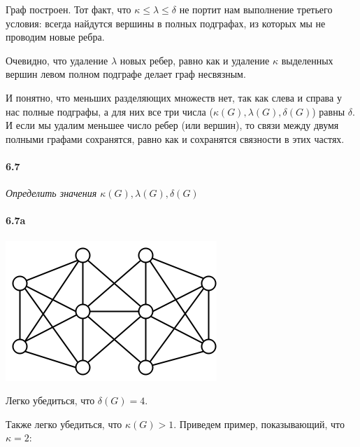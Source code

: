 \documentclass[russian]{article}
\begin{document}
Граф построен. Тот факт, что $\kappa \leqslant \lambda \leqslant \delta$ не портит нам выполнение третьего условия: всегда найдутся вершины в полных подграфах, из которых мы не проводим новые ребра.

Очевидно, что удаление $\lambda$ новых ребер, равно как и удаление $\kappa$ выделенных вершин левом полном подграфе делает граф несвязным.

И понятно, что меньших разделяющих множеств нет, так как слева и справа у нас полные подграфы, а для них все три числа ($\kappa(G), \lambda(G), \delta(G)$) равны $\delta$. И если мы удалим меньшее число ребер (или вершин), то связи между двумя полными графами сохранятся, равно как и сохранятся связности в этих частях.

\paragraph{6.7} \textit{Определить значения $\kappa(G), \lambda(G), \delta(G)$}

\paragraph{6.7a}

\begin{center}
\includegraphics[scale=0.5]{6_7a_1.png}
\par\end{center}

Легко убедиться, что $\delta(G)=4$.

Также легко убедиться, что $\kappa(G)>1$. Приведем пример, показывающий,
что $\kappa=2$:
\end{document}
